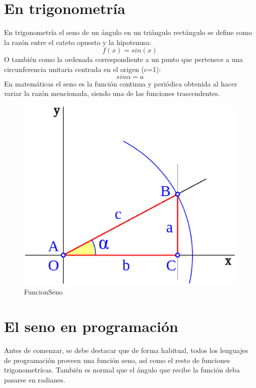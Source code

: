 \section{En trigonometría}

\label{1:sec:1}
En trigonometría el seno de un ángulo en un triángulo rectángulo se define como la razón entre
el cateto opuesto y la hipotenusa:\[f(x)=sin(x)\]
O también como la ordenada correspondiente a un punto que pertenece a una circunferencia unitaria
centrada en el origen (c=1):\[sin \alpha =a\]
En matemáticas el seno es la función continua y periódica obtenida al hacer variar la razón mencionada,
siendo una de las funciones trascendentes.
\begin{figure}[h]
\begin{center}
\includegraphics[scale=0.2]{images/seno.eps}
\end{center}
\caption{FuncionSeno}
\label{graph:3}
\end{figure}

\section{El seno en programación}
\label{1:sec:2}

   Antes de comenzar, se debe destacar  que de forma habitual, todos los
lenguajes de programación proveen una función seno, así como el resto de 
funciones trigonometrícas. También es normal  que el ángulo que recibe la
función deba pasarse en radianes.

